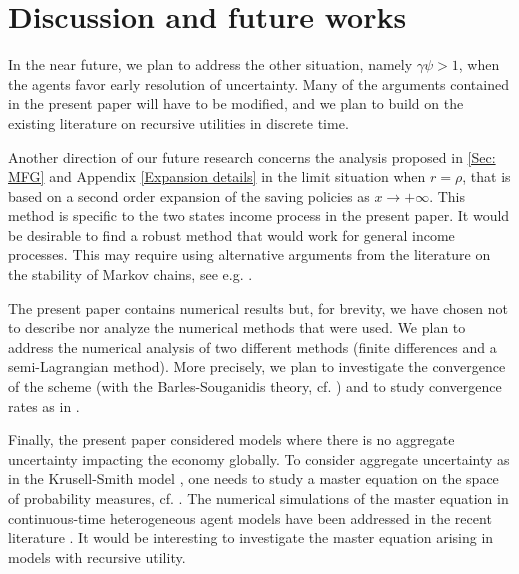 \documentclass[11pt]{article}
\numberwithin{equation}{section}
\theoremstyle{definition}
\theoremstyle{plain}
\begin{document}
\section{Discussion and future works}
{}{In the near future}, we plan to address the other situation, namely  $\gamma\psi>1$,   when the agents favor early resolution of uncertainty. Many of the arguments contained in the present paper will have to be modified, and we plan to build on the existing literature on recursive utilities in discrete time.\par
Another direction of our future research concerns the analysis proposed in \cref{Sec: MFG} and Appendix \ref{Expansion details} in the limit situation when $r=\rho$,  that is based on a second order expansion of the saving policies as $x\to +\infty$. This method is specific to the two states income process in the present paper. It would be desirable to find a robust method that would work for general income processes. This may require using alternative arguments from the literature on the stability of Markov chains, see e.g. \cite{meyn2012markov}.\par
The present paper contains numerical results but, for brevity, we have chosen not to describe nor analyze the numerical methods that were used.  We plan to address the numerical analysis of two different methods (finite differences and a semi-Lagrangian method). More precisely, we plan to investigate the convergence of the scheme (with the Barles-Souganidis theory, cf. \cite{barles1991convergence}) and to study convergence rates as in \cite{Crandall1984}. \par 
Finally, the present paper considered models where there is no aggregate uncertainty impacting the economy globally. To consider aggregate uncertainty as in the Krusell-Smith model \cite{krusell1998income}, one needs to study a master equation on the space of {}{probability measures}, cf. \cite{cardaliaguet2019master}. The numerical simulations of the master equation in continuous-time heterogeneous agent models have been addressed in the recent literature \cite{bilal2023solving,gu2024global}. It would be interesting to investigate the master equation arising in models with recursive utility.
\end{document}
